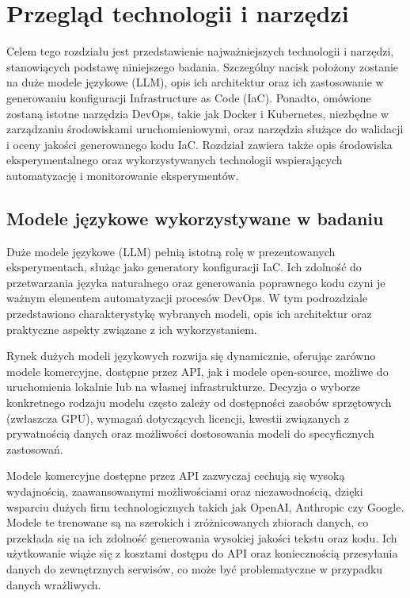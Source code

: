 \clearpage %

\section{Przegląd technologii i narzędzi}

Celem tego rozdziału jest przedstawienie najważniejszych technologii i narzędzi, stanowiących podstawę niniejszego badania. Szczególny nacisk położony zostanie na duże modele językowe (LLM), opis ich architektur oraz ich zastosowanie w generowaniu konfiguracji Infrastructure as Code (IaC). Ponadto, omówione zostaną istotne narzędzia DevOps, takie jak Docker i Kubernetes, niezbędne w zarządzaniu środowiskami uruchomieniowymi, oraz narzędzia służące do walidacji i oceny jakości generowanego kodu IaC. Rozdział zawiera także opis środowiska eksperymentalnego oraz wykorzystywanych technologii wspierających automatyzację i monitorowanie eksperymentów.

\subsection{Modele językowe wykorzystywane w badaniu}

Duże modele językowe (LLM) pełnią istotną rolę w prezentowanych eksperymentach, służąc jako generatory konfiguracji IaC. Ich zdolność do przetwarzania języka naturalnego oraz generowania poprawnego kodu czyni je ważnym elementem automatyzacji procesów DevOps. W tym podrozdziale przedstawiono charakterystykę wybranych modeli, opis ich architektur oraz praktyczne aspekty związane z ich wykorzystaniem.

Rynek dużych modeli językowych rozwija się dynamicznie, oferując zarówno modele komercyjne, dostępne przez API, jak i modele open-source, możliwe do uruchomienia lokalnie lub na własnej infrastrukturze. Decyzja o wyborze konkretnego rodzaju modelu często zależy od dostępności zasobów sprzętowych (zwłaszcza GPU), wymagań dotyczących licencji, kwestii związanych z prywatnością danych oraz możliwości dostosowania modeli do specyficznych zastosowań.

Modele komercyjne dostępne przez API zazwyczaj cechują się wysoką wydajnością, zaawansowanymi możliwościami oraz niezawodnością, dzięki wsparciu dużych firm technologicznych takich jak OpenAI, Anthropic czy Google. Modele te trenowane są na szerokich i zróżnicowanych zbiorach danych, co przekłada się na ich zdolność generowania wysokiej jakości tekstu oraz kodu. Ich użytkowanie wiąże się z kosztami dostępu do API oraz koniecznością przesyłania danych do zewnętrznych serwisów, co może być problematyczne w przypadku danych wrażliwych.

